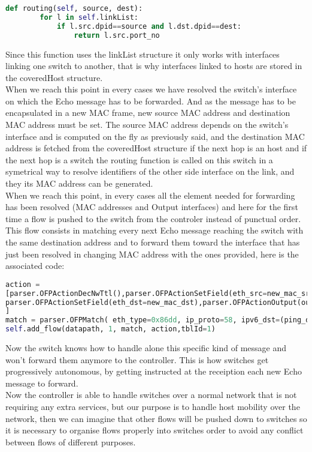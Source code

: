 \documentclass{article}
\begin{document}
\begin{lstlisting}[frame=single,language=Python] 
    def routing(self, source, dest):
        for l in self.linkList:
            if l.src.dpid==source and l.dst.dpid==dest:
                return l.src.port_no
\end{lstlisting}

Since this function uses the linkList structure it only works with
interfaces linking one switch to another, that is why interfaces
linked to hosts are stored in the coveredHost structure.\\
\newline
When we reach this point in every cases we have resolved the switch's
interface on which the Echo message has to be forwarded. And as the
message has to be encapsulated in a new MAC frame, new source MAC
address and destination MAC address must be set. The source MAC
address depends on the switch's interface and is computed on the fly
as previously said, and the destination MAC address is fetched from
the coveredHost structure if the next hop is an host and if the next
hop is a switch the routing function is called on this switch in a
symetrical way to resolve identifiers of the other side interface on
the link, and they its MAC address can be generated.\\
\newline
When we reach this point, in every cases all the element needed for
forwarding has been resolved (MAC addresses and Output interfaces) and
here for the first time a flow is pushed to the switch from the
controler instead of punctual order. This flow consists in matching
every next Echo message reaching the switch with the same destination
address and to forward them toward the interface that has just been
resolved in changing MAC address with the ones provided, here is the
associated code:

\begin{lstlisting}[frame=single,language=Python] 
action =
[parser.OFPActionDecNwTtl(),parser.OFPActionSetField(eth_src=new_mac_src),
parser.OFPActionSetField(eth_dst=new_mac_dst),parser.OFPActionOutput(outputIntf)
]
match = parser.OFPMatch( eth_type=0x86dd, ip_proto=58, ipv6_dst=(ping_dst,'ffff:ffff:ffff:ffff:ffff:ffff:ffff:ffff'))
self.add_flow(datapath, 1, match, action,tblId=1)
\end{lstlisting}

Now the switch knows how to handle alone this specific kind of message
and won't forward them anymore to the controller. This is how switches
get progressively autonomous, by getting instructed at the receiption
each new Echo message to forward.\\
\newline
Now the controller is able to handle switches over a normal network
that is not requiring any extra services, but our purpose is to handle
host mobility over the network, then we can imagine that other flows
will be pushed down to switches so it is necessary to organise flows
properly into switches order to avoid any conflict between flows of
different purposes.
\end{document}
